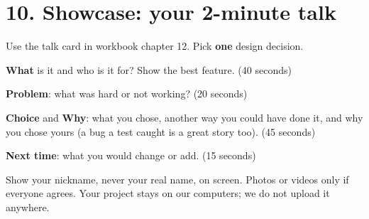 \documentclass[level=3]{kidscode}
\begin{document}
\section{10. Showcase: your 2-minute talk}
Use the talk card in workbook chapter 12. Pick \textbf{one} design decision.
\begin{checklist}
  \item \textbf{What} is it and who is it for? Show the best feature. (40 seconds)
  \item \textbf{Problem}: what was hard or not working? (20 seconds)
  \item \textbf{Choice} and \textbf{Why}: what you chose, another way you could have done it,
        and why you chose yours (a bug a test caught is a great story too). (45 seconds)
  \item \textbf{Next time}: what you would change or add. (15 seconds)
\end{checklist}

\begin{safety}
Show your nickname, never your real name, on screen. Photos or videos only if everyone agrees.
Your project stays on our computers; we do not upload it anywhere.
\end{safety}
\end{document}
